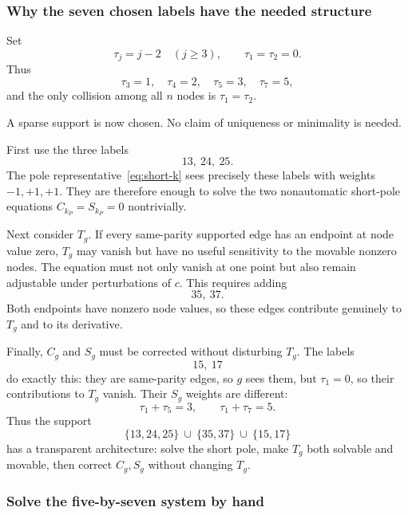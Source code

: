 \documentclass[11pt]{article}
\theoremstyle{definition}
\begin{document}
\subsubsection{Why the seven chosen labels have the needed structure}

Set
\begin{equation}
\tau_j=j-2\quad(j\ge3),
\qquad
\tau_1=\tau_2=0.
\label{eq:short-nodes}
\end{equation}
Thus
\[
\tau_3=1,\quad \tau_4=2,\quad \tau_5=3,\quad \tau_7=5,
\]
and the only collision among all $n$ nodes is $\tau_1=\tau_2$.

A sparse support is now chosen.  No claim of uniqueness or minimality is needed.

First use the three labels
\[
13,\ 24,\ 25.
\]
The pole representative~\eqref{eq:short-k} sees precisely these labels with weights $-1,+1,+1$.  They are therefore enough to solve the two nonautomatic short-pole equations $C_{k_P}=S_{k_P}=0$ nontrivially.

Next consider $T_g$.  If every same-parity supported edge has an endpoint at node value zero, $T_g$ may vanish but have no useful sensitivity to the movable nonzero nodes.  The equation must not only vanish at one point but also remain adjustable under perturbations of $c$.  This requires adding
\[
35,\ 37.
\]
Both endpoints have nonzero node values, so these edges contribute genuinely to $T_g$ and to its derivative.

Finally, $C_g$ and $S_g$ must be corrected without disturbing $T_g$.  The labels
\[
15,\ 17
\]
do exactly this: they are same-parity edges, so $g$ sees them, but $\tau_1=0$, so their contributions to $T_g$ vanish.  Their $S_g$ weights are different:
\[
\tau_1+\tau_5=3,
\qquad
\tau_1+\tau_7=5.
\]
Thus the support
\begin{equation}
\{13,24,25\}
\ \cup\ \{35,37\}
\ \cup\ \{15,17\}
\label{eq:short-support}
\end{equation}
has a transparent architecture: solve the short pole, make $T_g$ both solvable and movable, then correct $C_g,S_g$ without changing $T_g$.

\subsubsection{Solve the five-by-seven system by hand}
\end{document}
